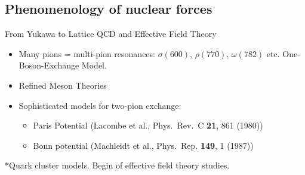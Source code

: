 \documentclass[%
twoside,                 %
final,                   %
10pt]{article}
\begin{document}
\subsection{Phenomenology of nuclear forces}
\begin{block}{From Yukawa to Lattice QCD and Effective Field Theory }

\begin{itemize}
\item Many pions = multi-pion resonances: $\sigma(600)$,  $\rho(770)$,  $\omega(782)$ etc. One-Boson-Exchange Model.

\item Refined Meson Theories

\item Sophisticated models for two-pion exchange:
\begin{itemize}

      \item Paris Potential (Lacombe et al., Phys.~Rev.~C \textbf{21}, 861 (1980))

      \item Bonn potential (Machleidt et al., Phys.~Rep. \textbf{149}, 1 (1987))
\end{itemize}

\noindent
\end{itemize}

\noindent
*Quark cluster models. Begin of effective field theory studies.

\end{block}

\end{document}
